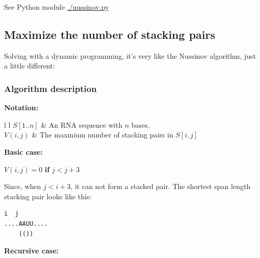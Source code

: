 \documentclass[10pt]{article}
\begin{document}
See Python module \url{./nussinov.py}

\subsection{Maximize the number of stacking pairs}
\label{sec:max_stack}
Solving with a dynamic programming,
it's very like the Nussinov algorithm, just a little different:

\subsubsection{Algorithm description}
\noindent
\textbf{Notation:}

\begin{center}
    \begin{tabular}{{l} {l}}
        $S[1..n]$ & An RNA sequence with $n$ bases. \\
        $V(i, j)$ & The maxmium number of stacking pairs in $S[i,j]$\\
    \end{tabular}
\end{center}

\noindent
\textbf{Basic case:}

\begin{center}
    $V(i,j) = 0$ \textbf{if} $j < j+3$
\end{center}

Since, when $j < i + 3$, it can not form a stacked pair.
The shortest span length stacking pair looks like this:

\begin{lstlisting}[xleftmargin=.4\textwidth]
    i  j
....AAUU....
    (())
\end{lstlisting}

\noindent
\textbf{Recursive case:}
\end{document}
